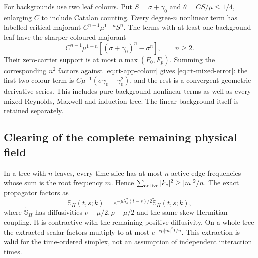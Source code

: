 \documentclass[11pt,a4paper]{amsart}
\theoremstyle{definition}
\theoremstyle{remark}
\numberwithin{equation}{section}
\begin{document}
For backgrounds use two leaf colours.  Put $S=\sigma+\gamma_0$ and
$\theta=CS/\mu\le1/4$, enlarging $C$ to include Catalan counting.
Every degree-$n$ nonlinear term has labelled critical majorant
$C^{n-1}\mu^{1-n}S^n$.  The terms with at least one background leaf
have the sharper coloured majorant
\begin{equation}\label{eq:rt-app-colour}
 C^{n-1}\mu^{1-n}[(\sigma+\gamma_0)^n-\sigma^n],\qquad n\ge2.
\end{equation}
Their zero-carrier support is at most $n\max(F_0,F_p)$.  Summing the
corresponding $n^2$ factors against \eqref{eq:rt-app-colour} gives
\eqref{eq:rt-mixed-error}: the first two-colour term is
$C\mu^{-1}(\sigma\gamma_0+\gamma_0^2)$, and the rest is a convergent
geometric derivative series.  This includes pure-background nonlinear
terms as well as every mixed Reynolds, Maxwell and induction tree.
The linear background itself is retained separately.

\subsection{Clearing of the complete remaining physical field}
In a tree with $n$ leaves, every time slice has at most $n$ active edge
frequencies whose sum is the root frequency $m$.  Hence
$\sum_{\rm active}|k_e|^2\ge|m|^2/n$.
The exact propagator factors as
\[
 \mathbb S_H(t,s;k)
  =e^{-\mu\lambda_k^2(t-s)/2}\widetilde{\mathbb S}_H(t,s;k),
\]
where $\widetilde{\mathbb S}_H$ has diffusivities
$\nu-\mu/2,\rho-\mu/2$ and the same skew-Hermitian coupling.  It is
contractive with the remaining positive diffusivity.  On a whole tree
the extracted scalar factors multiply to at most
$e^{-c\mu|m|^2T/n}$.  This extraction is valid for the time-ordered
simplex, not an assumption of independent interaction times.
\end{document}
